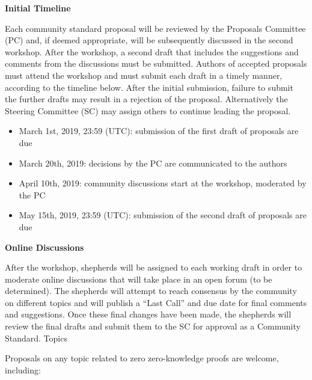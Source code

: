 \documentclass{article}
\begin{document}
{\bf Initial Timeline}

Each community standard proposal will be reviewed by the Proposals Committee (PC) and, if deemed appropriate, will be subsequently discussed in the second workshop. After the workshop, a second draft that includes the suggestions and comments from the discussions must be submitted. Authors of accepted proposals must attend the workshop and must submit each draft in a timely manner, according to the timeline below. After the initial submission, failure to submit the further drafts may result in a rejection of the proposal. Alternatively the Steering Committee (SC) may assign others to continue leading the proposal.

\begin{itemize}
	\item March 1st, 2019, 23:59 (UTC): submission of the first draft of proposals are due
	\item March 20th, 2019: decisions by the PC are communicated to the authors
	\item April 10th, 2019: community discussions start at the workshop, moderated by the PC
	\item May 15th, 2019, 23:59 (UTC): submission of the second draft of proposals are due 
\end{itemize}

{\bf Online Discussions}

After the workshop, shepherds will be assigned to each working draft in order to moderate online discussions that will take place in an open forum (to be determined). The shepherds will attempt to reach consensus by the community on different topics and will publish a “Last Call” and due date for final comments and suggestions. Once these final changes have been made, the shepherds will review the final drafts and submit them to the SC for approval as a Community Standard.
Topics

Proposals on any topic related to zero zero-knowledge proofs are welcome, including:
\end{document}
